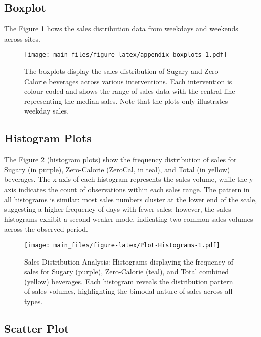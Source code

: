 \documentclass[
]{article}
\begin{document}
\hypertarget{boxplot}{%
\subsection{Boxplot}\label{boxplot}}

The Figure \ref{fig:appendix-boxplots} hows the sales distribution data from weekdays and weekends across sites.

\begin{figure}
\centering
\texttt{[image: main\_files/figure-latex/appendix-boxplots-1.pdf]}
\caption{\label{fig:appendix-boxplots}The boxplots display the sales distribution of Sugary and Zero-Calorie beverages across various interventions. Each intervention is colour-coded and shows the range of sales data with the central line representing the median sales. Note that the plots only illustrates weekday sales.}
\end{figure}

\hypertarget{histogram-plots}{%
\subsection{Histogram Plots}\label{histogram-plots}}

The Figure \ref{fig:Plot-Histograms} (histogram plots) show the frequency distribution of sales for Sugary (in purple), Zero-Calorie (ZeroCal, in teal), and Total (in yellow) beverages. The x-axis of each histogram represents the sales volume, while the y-axis indicates the count of observations within each sales range. The pattern in all histograms is similar: most sales numbers cluster at the lower end of the scale, suggesting a higher frequency of days with fewer sales; however, the sales histograms exhibit a second weaker mode, indicating two common sales volumes across the observed period.

\begin{figure}
\centering
\texttt{[image: main\_files/figure-latex/Plot-Histograms-1.pdf]}
\caption{\label{fig:Plot-Histograms}Sales Distribution Analysis: Histograms displaying the frequency of sales for Sugary (purple), Zero-Calorie (teal), and Total combined (yellow) beverages. Each histogram reveals the distribution pattern of sales volumes, highlighting the bimodal nature of sales across all types.}
\end{figure}

\hypertarget{scatter-plot}{%
\subsection{Scatter Plot}\label{scatter-plot}}
\end{document}
